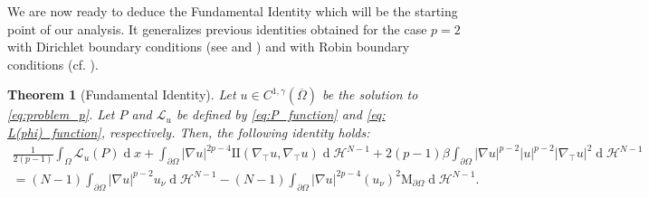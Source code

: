 \documentclass[10pt,a4paper, reqno]{amsart}
\numberwithin{equation}{section}
\newtheorem{teo}{Theorem}[section]
\renewcommand{\d}[1]{\ensuremath{\operatorname{d}\!{#1}}}
\begin{document}
We are now ready to deduce the Fundamental Identity which will be the starting point of our analysis. It generalizes previous identities obtained for the case $p=2$ with Dirichlet boundary conditions (see \cite[Thm. 2.1]{mapo19} and \cite[Thm. 2.4]{mp2020}) and with Robin boundary conditions (cf. \cite[Thm. 3]{gamo26}).  

\begin{teo}[Fundamental Identity] \label{teo:fundamental}
Let $u \in C^{1,\gamma}(\overline{\Omega})$ be the solution to \eqref{eq:problem_p}. Let $P$ and $\mathcal{L}_u$ be defined by \eqref{eq:P_function} and \eqref{eq: L(phi)_function}, respectively. Then, the following identity holds:
\begin{equation}\label{eq: fundamental identity}
    \begin{aligned}
    \frac{1}{2(p-1)}\int_\Omega \mathcal{L}_u(P) \d{x}+\int_{\partial\Omega} |\nabla u|^{2p-4} \mathrm{I\!I}(\nabla_\top u,\nabla_\top u) \d{}\mathcal{H}^{N-1}+ 2(p-1) \beta\int_{\partial\Omega} |\nabla u|^{p-2}|u|^{p-2}|\nabla_\top u|^2 \d{}\mathcal{H}^{N-1} \\= (N-1) \int_{\partial\Omega} |\nabla u|^{p-2} u_\nu \d{}\mathcal{H}^{N-1}
    - (N-1) \int_{\partial\Omega} |\nabla u|^{2p-4} (u_\nu)^2 \mathrm{M}_{\partial\Omega} \d{}\mathcal{H}^{N-1}.
    \end{aligned}
\end{equation}
\end{teo}
\end{document}
